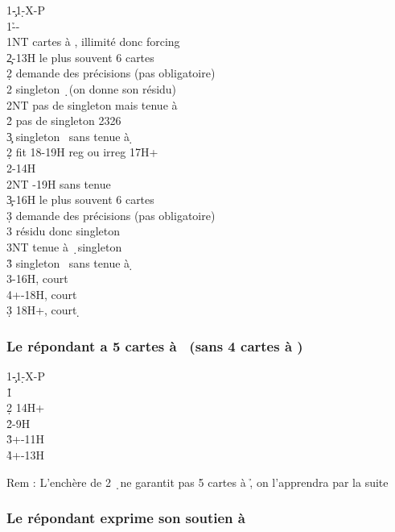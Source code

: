 \documentclass[a4paper]{article}
\begin{document}
\begin{bidtable}
1\c-1\d-X-P\\
1\h--\\
1NT  cartes à \s , illimité donc forcing\+\\
2\c {}-13H le plus souvent 6 cartes\+\\
2\d \> demande des précisions (pas obligatoire)\+\\
2\s \> singleton \d\ (on donne son résidu)\\
2NT \> pas de singleton mais tenue à \d \\
2\h \> pas de singleton 2326\\
3\c \> singleton \s\ sans tenue à \d \-\-\\
2\d \> fit 18-19H reg ou irreg 17H+\\
2\s {}-14H\\
2NT -19H sans tenue\\
3\c {}-16H le plus souvent 6 cartes\+\\
3\d \> demande des précisions (pas obligatoire)\+\\
3\s \> résidu donc singleton \d \\
3NT \> tenue à \d\ singleton \s \\
3\h \> singleton \s\ sans tenue à \d \-\-\\
3\s {}-16H, court \d \\
4\s {}+-18H, court \d \\
3\d \> 18H+, court \d \-
\end{bidtable}

\subsubsection{Le répondant a 5 cartes à \pdfh\ (sans 4 cartes à \pdfs)}

\begin{bidtable}
1\c-1\d-X-P\\
1\h\+\\
2\d \> 14H+\\
2\h {}-9H\\
3\h {}+-11H\\
4\h {}+-13H\-
\end{bidtable}

Rem : L’enchère de 2 \d\ ne garantit pas 5 cartes à \h , on l’apprendra par la suite

\subsubsection{Le répondant exprime son soutien à \pdfc}
\end{document}
